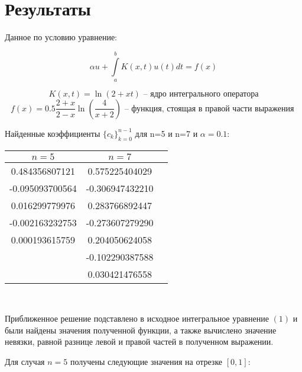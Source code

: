 \documentclass[12pt,a4paper]{article}
\begin{document}
\section{Результаты}

Данное по условию уравнение:


$$ \alpha u + \int\limits_a^b K(x,t) u(t) dt = f(x) $$

$$ K(x,t) = \ln (2 + xt) \text{ \ \ -- \  ядро интегрального оператора} $$ 
$$ f(x) = 0.5\frac{2+x}{2-x} \ln \left ( \frac{4}{x+2} \right )
  \text{ \ \ -- \ функция, стоящая в правой части выражения } 
$$


Найденные коэффициенты $\{ c_k \}_{k=0}^{n-1}$ для n=5 и n=7 и $\alpha=0.1$:

\begin{center}
\begin{tabular}{ccc}
$n=5$ & $n=7$ \\
\hline

 0.484356807121 &  0.575225404029 \\
-0.095093700564 & -0.306947432210 \\
 0.016299779976 &  0.283766892447 \\
-0.002163232753 & -0.273607279290 \\
 0.000193615759 &  0.204050624058 \\
                & -0.102290387588 \\
                &  0.030421476558 \\
\end{tabular}
\end{center}


\

Приближенное решение подставлено в исходное интегральное уравнение $(1)$ и были найдены значения полученной функции, а также вычислено значение невязки, равной разнице левой и правой частей в полученном выражении.

Для случая $n=5$ получены следующие значения на отрезке $[0,1]$:
\end{document}
